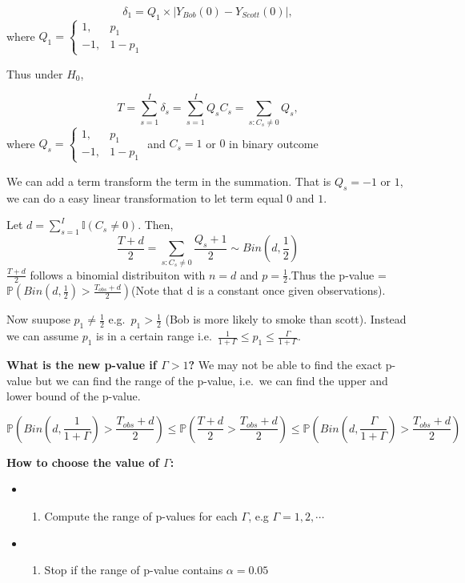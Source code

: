 \documentclass[
]{book}
\providecommand{\tightlist}{%
  \setlength{\itemsep}{0pt}\setlength{\parskip}{0pt}}
\begin{document}
\[\delta_1 = Q_1 \times |Y_{Bob}(0) - Y_{Scott}(0)|,\]
where \(Q_1 = \begin{cases}  1,& p_1\\  -1,& 1 - p_1 \end{cases}\)

Thus under \(H_0\),

\[T = \sum_{s=1}^{I} \delta_s = \sum_{s=1}^{I}Q_sC_s = \sum_{s:C_s\neq0}Q_s,\]
where \(Q_s = \begin{cases}  1,& p_1\\  -1,& 1 - p_1 \end{cases}\) and \(C_s = 1\) or \(0\) in binary outcome

We can add a term transform the term in the summation. That is \(Q_s = -1\) or \(1\), we can do a easy linear transformation to let term equal \(0\) and \(1\).

Let \(d = \sum_{s=1}^{I} \mathbb{I}(C_s \neq 0)\). Then,
\[\frac{T+d}{2} = \sum_{s:C_s\neq0}\frac{Q_s+1}{2} \sim Bin(d, \frac{1}{2})\]
\(\frac{T+d}{2}\) follows a binomial distribuiton with \(n=d\) and \(p=\frac{1}{2}\).Thus the p-value = \(\mathbb{P}(Bin(d,\frac{1}{2}) > \frac{T_{obs} + d}{2})\)(Note that d is a constant once given observations).

Now suupose \(p_1 \neq \frac{1}{2}\) e.g.~\(p_1 > \frac{1}{2}\) (Bob is more likely to smoke than scott). Instead we can assume \(p_1\) is in a certain range i.e.~\(\frac{1}{1+\Gamma} \leq p_1 \leq \frac{\Gamma}{1+\Gamma}\).

\textbf{What is the new p-value if \(\Gamma > 1\)?} We may not be able to find the exact p-value but we can find the range of the p-value, i.e.~we can find the upper and lower bound of the p-value.

\[\mathbb{P}(Bin(d, \frac{1}{1+\Gamma}) > \frac{T_{obs}+d}{2}) \leq \mathbb{P}(\frac{T+d}{2} > \frac{T_{obs}+d}{2}) \leq \mathbb{P}(Bin(d, \frac{\Gamma}{1+\Gamma}) > \frac{T_{obs}+d}{2})\]

\textbf{How to choose the value of \(\Gamma\):}

\begin{itemize}
\item
  \begin{enumerate}
  \def\labelenumi{\arabic{enumi}.}
  \tightlist
  \item
    Compute the range of p-values for each \(\Gamma\), e.g \(\Gamma = 1,2,\cdots\)
  \end{enumerate}
\item
  \begin{enumerate}
  \def\labelenumi{\arabic{enumi}.}
  \setcounter{enumi}{1}
  \tightlist
  \item
    Stop if the range of p-value contains \(\alpha = 0.05\)
  \end{enumerate}
\end{itemize}
\end{document}
